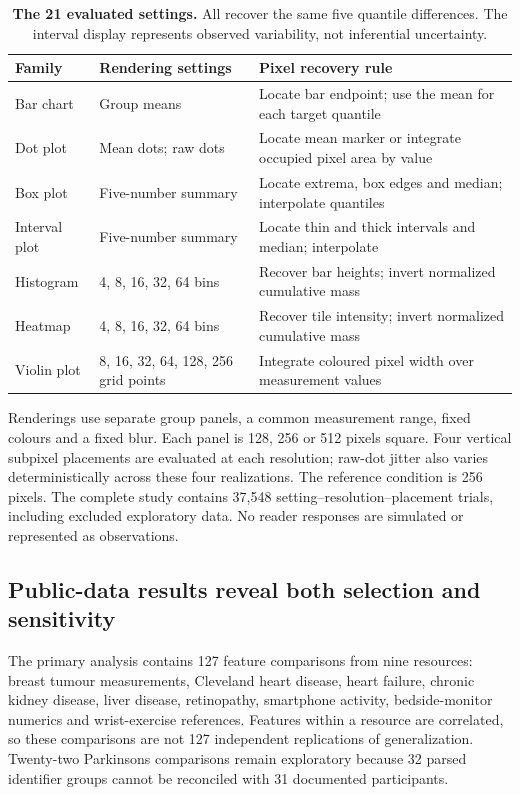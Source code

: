 \documentclass[11pt]{article}
\begin{document}
\begin{table}[ht]\centering\small
\caption{\textbf{The 21 evaluated settings.} All recover the same five quantile differences. The interval display represents observed variability, not inferential uncertainty.}\label{tab:contracts}
\begin{tabular}{p{2.7cm}p{4.0cm}p{7.1cm}}\toprule
Family & Rendering settings & Pixel recovery rule\\\midrule
Bar chart & Group means & Locate bar endpoint; use the mean for each target quantile\\
Dot plot & Mean dots; raw dots & Locate mean marker or integrate occupied pixel area by value\\
Box plot & Five-number summary & Locate extrema, box edges and median; interpolate quantiles\\
Interval plot & Five-number summary & Locate thin and thick intervals and median; interpolate\\
Histogram & 4, 8, 16, 32, 64 bins & Recover bar heights; invert normalized cumulative mass\\
Heatmap & 4, 8, 16, 32, 64 bins & Recover tile intensity; invert normalized cumulative mass\\
Violin plot & 8, 16, 32, 64, 128, 256 grid points & Integrate coloured pixel width over measurement values\\\bottomrule
\end{tabular}
\end{table}

Renderings use separate group panels, a common measurement range, fixed colours and a fixed blur. Each panel is 128, 256 or 512 pixels square. Four vertical subpixel placements are evaluated at each resolution; raw-dot jitter also varies deterministically across these four realizations. The reference condition is 256 pixels. The complete study contains 37,548 setting--resolution--placement trials, including excluded exploratory data. No reader responses are simulated or represented as observations.

\subsection*{Public-data results reveal both selection and sensitivity}
The primary analysis contains 127 feature comparisons from nine resources: breast tumour measurements, Cleveland heart disease, heart failure, chronic kidney disease, liver disease, retinopathy, smartphone activity, bedside-monitor numerics and wrist-exercise references.\cite{wdbc,heart,failure,kidney,liver,retina,har,bidmc,wrist} Features within a resource are correlated, so these comparisons are not 127 independent replications of generalization. Twenty-two Parkinsons comparisons remain exploratory because 32 parsed identifier groups cannot be reconciled with 31 documented participants.\cite{parkinsons}
\end{document}
